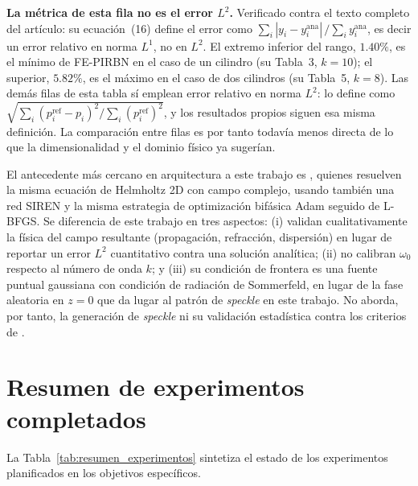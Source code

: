 \begin{table}[htbp]
\begin{threeparttable}
\begin{tablenotes}
    \item[c] \textbf{La métrica de esta fila no es el error $L^2$.} Verificado
    contra el texto completo del artículo: su ecuación~(16) define el error como
    $\sum_i|y_i-y_i^{\text{ana}}|\,/\sum_i y_i^{\text{ana}}$, es decir un error
    relativo en norma $L^1$, no en $L^2$. El extremo inferior del rango,
    $1.40\%$, es el mínimo de FE-PIRBN en el caso de un cilindro (su Tabla~3,
    $k=10$); el superior, $5.82\%$, es el máximo en el caso de dos cilindros (su
    Tabla~5, $k=8$). Las demás filas de esta tabla sí emplean error relativo en
    norma $L^2$: \textcite{schoder2024helmholtz} lo define como
    $\sqrt{\sum_i(p_i^{\text{ref}}-p_i)^2/\sum_i(p_i^{\text{ref}})^2}$, y los
    resultados propios siguen esa misma definición. La comparación entre filas
    es por tanto todavía menos directa de lo que la dimensionalidad y el dominio
    físico ya sugerían.
\end{tablenotes}
\end{threeparttable}
\end{table}

El antecedente más cercano en arquitectura a este trabajo es
\textcite{panagiotakopoulos2026helmholtz}, quienes resuelven la misma ecuación
de Helmholtz 2D con campo complejo, usando también una red SIREN y la misma
estrategia de optimización bifásica Adam seguido de L-BFGS. Se diferencia de
este trabajo en tres aspectos: (i) validan cualitativamente la física del
campo resultante (propagación, refracción, dispersión) en lugar de reportar
un error $L^2$ cuantitativo contra una solución analítica; (ii) no calibran
$\omega_0$ respecto al número de onda $k$; y (iii) su condición de frontera es
una fuente puntual gaussiana con condición de radiación de Sommerfeld, en
lugar de la fase aleatoria en $z=0$ que da lugar al patrón de \textit{speckle}
en este trabajo. No aborda, por tanto, la generación de \textit{speckle} ni su
validación estadística contra los criterios de \textcite{goodman2007speckle}.

\section{Resumen de experimentos completados}

La Tabla~\ref{tab:resumen_experimentos} sintetiza el estado de los experimentos
planificados en los objetivos específicos.


